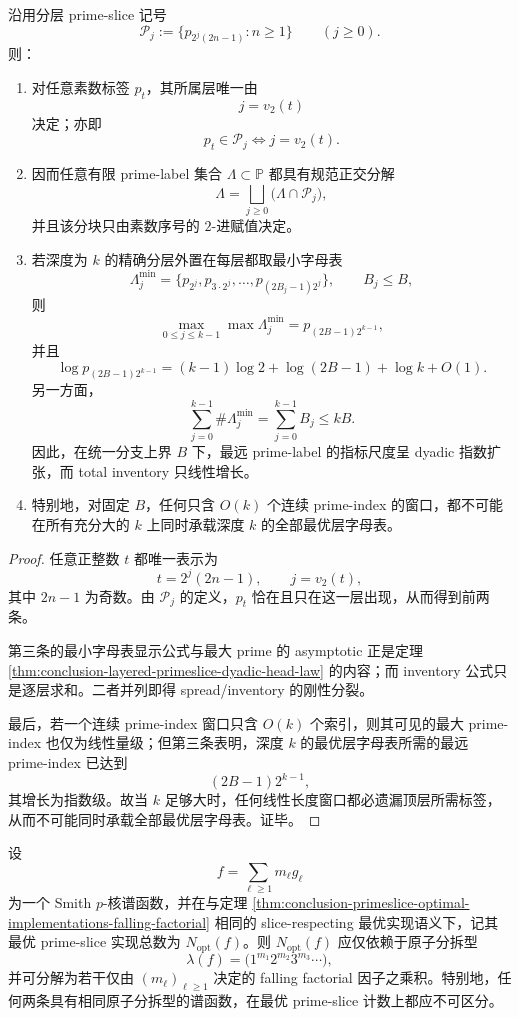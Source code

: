 \begin{theorem}\label{thm:conclusion-primeslice-v2-layer-spread-inventory}
沿用分层 prime-slice 记号
\[
\mathcal P_j:=\{p_{2^j(2n-1)}:n\ge 1\}
\qquad(j\ge 0).
\]
则：
\begin{enumerate}
\item 对任意素数标签 \(p_t\)，其所属层唯一由
\[
j=v_2(t)
\]
决定；亦即
\[
p_t\in \mathcal P_j
\iff
j=v_2(t).
\]
\item 因而任意有限 prime-label 集合 \(\Lambda\subset \mathbb P\) 都具有规范正交分解
\[
\Lambda=\bigsqcup_{j\ge 0}\bigl(\Lambda\cap \mathcal P_j\bigr),
\]
并且该分块只由素数序号的 \(2\)-进赋值决定。
\item 若深度为 \(k\) 的精确分层外置在每层都取最小字母表
\[
\Lambda_j^{\min}
=
\{p_{2^j},p_{3\cdot 2^j},\dots,p_{(2B_j-1)2^j}\},
\qquad
B_j\le B,
\]
则
\[
\max_{0\le j\le k-1}\max \Lambda_j^{\min}
=
p_{(2B-1)2^{k-1}},
\]
并且
\[
\log p_{(2B-1)2^{k-1}}
=
(k-1)\log 2+\log(2B-1)+\log k+O(1).
\]
另一方面，
\[
\sum_{j=0}^{k-1}\#\Lambda_j^{\min}
=
\sum_{j=0}^{k-1}B_j
\le kB.
\]
因此，在统一分支上界 \(B\) 下，最远 prime-label 的指标尺度呈 dyadic 指数扩张，而 total inventory 只线性增长。
\item 特别地，对固定 \(B\)，任何只含 \(O(k)\) 个连续 prime-index 的窗口，都不可能在所有充分大的 \(k\) 上同时承载深度 \(k\) 的全部最优层字母表。
\end{enumerate}
\end{theorem}
\begin{proof}
任意正整数 \(t\) 都唯一表示为
\[
t=2^j(2n-1),
\qquad
j=v_2(t),
\]
其中 \(2n-1\) 为奇数。由 \(\mathcal P_j\) 的定义，\(p_t\) 恰在且只在这一层出现，从而得到前两条。

第三条的最小字母表显示公式与最大 prime 的 asymptotic 正是定理 \ref{thm:conclusion-layered-primeslice-dyadic-head-law} 的内容；而 inventory 公式只是逐层求和。二者并列即得 spread/inventory 的刚性分裂。

最后，若一个连续 prime-index 窗口只含 \(O(k)\) 个索引，则其可见的最大 prime-index 也仅为线性量级；但第三条表明，深度 \(k\) 的最优层字母表所需的最远 prime-index 已达到
\[
(2B-1)2^{k-1},
\]
其增长为指数级。故当 \(k\) 足够大时，任何线性长度窗口都必遗漏顶层所需标签，从而不可能同时承载全部最优层字母表。证毕。
\end{proof}

\begin{conjecture}\label{conj:conclusion-primeslice-optimal-count-partition-type}
设
\[
f=\sum_{\ell\ge 1}m_\ell g_\ell
\]
为一个 Smith \(p\)-核谱函数，并在与定理 \ref{thm:conclusion-primeslice-optimal-implementations-falling-factorial} 相同的 slice-respecting 最优实现语义下，记其最优 prime-slice 实现总数为 \(N_{\mathrm{opt}}(f)\)。则 \(N_{\mathrm{opt}}(f)\) 应仅依赖于原子分拆型
\[
\lambda(f)=\bigl(1^{m_1}2^{m_2}3^{m_3}\cdots\bigr),
\]
并可分解为若干仅由 \((m_\ell)_{\ell\ge 1}\) 决定的 falling factorial 因子之乘积。特别地，任何两条具有相同原子分拆型的谱函数，在最优 prime-slice 计数上都应不可区分。
\end{conjecture}

\endinput
